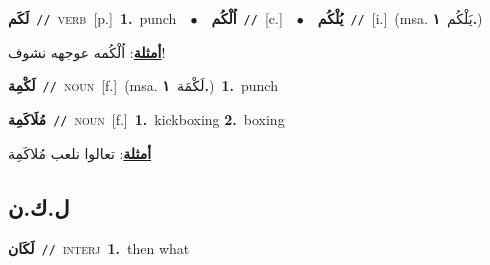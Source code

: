 \documentclass[10pt,a4paper,twoside]{article} %
\begin{document}
\begin{multicols}{2}
{\setlength\topsep{0pt}\textbf{\foreignlanguage{arabic}{لَكَم}}\ {\color{gray}\texttt{//}\color{black}}\ \textsc{verb}\ [p.]\ \textbf{1.}~punch\ \ $\bullet$\ \ \setlength\topsep{0pt}\textbf{\foreignlanguage{arabic}{اُلْكُم}}\ {\color{gray}\texttt{//}\color{black}}\ [c.]\ \ $\bullet$\ \ \setlength\topsep{0pt}\textbf{\foreignlanguage{arabic}{يُلْكُم}}\ {\color{gray}\texttt{//}\color{black}}\ [i.]\ \color{gray}(msa. \foreignlanguage{arabic}{يَلْكُم}~\foreignlanguage{arabic}{\textbf{١.}})\color{black}\  \begin{flushright}\color{gray}\foreignlanguage{arabic}{\textbf{\underline{\foreignlanguage{arabic}{أمثلة}}}: اُلْكُمه عوجهه نشوف!}\end{flushright}\color{black}} \vspace{2mm}

{\setlength\topsep{0pt}\textbf{\foreignlanguage{arabic}{لَكْمِة}}\ {\color{gray}\texttt{//}\color{black}}\ \textsc{noun}\ [f.]\ \color{gray}(msa. \foreignlanguage{arabic}{لَكْمَة}~\foreignlanguage{arabic}{\textbf{١.}})\color{black}\ \textbf{1.}~punch\ } \vspace{2mm}

{\setlength\topsep{0pt}\textbf{\foreignlanguage{arabic}{مُلَاكَمِة}}\ {\color{gray}\texttt{//}\color{black}}\ \textsc{noun}\ [f.]\ \textbf{1.}~kickboxing  \textbf{2.}~boxing\  \begin{flushright}\color{gray}\foreignlanguage{arabic}{\textbf{\underline{\foreignlanguage{arabic}{أمثلة}}}: تعالوا نلعب مُلاكَمِة}\end{flushright}\color{black}} \vspace{2mm}

\vspace{-3mm}
\subsection*{\color{blue}\foreignlanguage{arabic}{ل.ك.ن}\color{blue}{}} 

{\setlength\topsep{0pt}\textbf{\foreignlanguage{arabic}{لَكَان}}\ {\color{gray}\texttt{//}\color{black}}\ \textsc{interj}\ \textbf{1.}~then what\ } \vspace{2mm}


\end{multicols}
\end{document}

